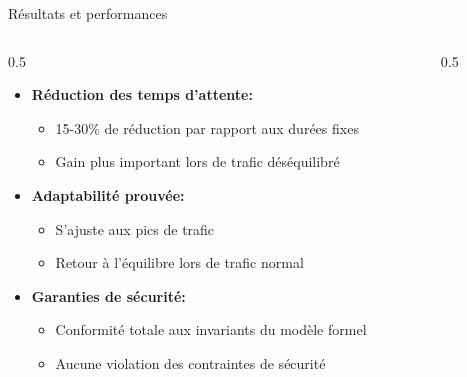 \begin{frame}{Résultats et performances}
  \begin{columns}
    \begin{column}{0.5\textwidth}
      \begin{itemize}
        \item<1-> \textbf{Réduction des temps d'attente:}
        \begin{itemize}
          \item 15-30\% de réduction par rapport aux durées fixes
          \item Gain plus important lors de trafic déséquilibré
        \end{itemize}
        \item<2-> \textbf{Adaptabilité prouvée:}
        \begin{itemize}
          \item S'ajuste aux pics de trafic
          \item Retour à l'équilibre lors de trafic normal
        \end{itemize}
        \item<3-> \textbf{Garanties de sécurité:}
        \begin{itemize}
          \item Conformité totale aux invariants du modèle formel
          \item Aucune violation des contraintes de sécurité
        \end{itemize}
      \end{itemize}
    \end{column}
    \begin{column}{0.5\textwidth}
    \end{column}
  \end{columns}
\end{frame}

